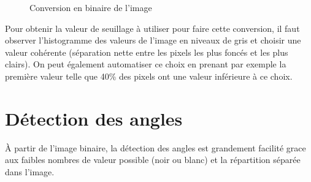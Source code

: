 \documentclass[a4paper]{article}
\begin{document}
        \begin{figure}[htbp]
            \begin{center}
                \caption{Conversion en binaire de l'image}
                \label{fig:binary}
            \end{center}
        \end{figure}

        Pour obtenir la valeur de seuillage à utiliser pour faire cette conversion, il faut observer l'histogramme des valeurs de l'image en niveaux de gris et choisir une valeur cohérente (séparation nette entre les pixels les plus foncés et les plus clairs). On peut également automatiser ce choix en prenant par exemple la première valeur telle que 40\% des pixels ont une valeur inférieure à ce choix.

    \section{Détection des angles}

        À partir de l'image binaire, la détection des angles est grandement facilité grace aux faibles nombres de valeur possible (noir ou blanc) et la répartition séparée dans l'image.
\end{document}
